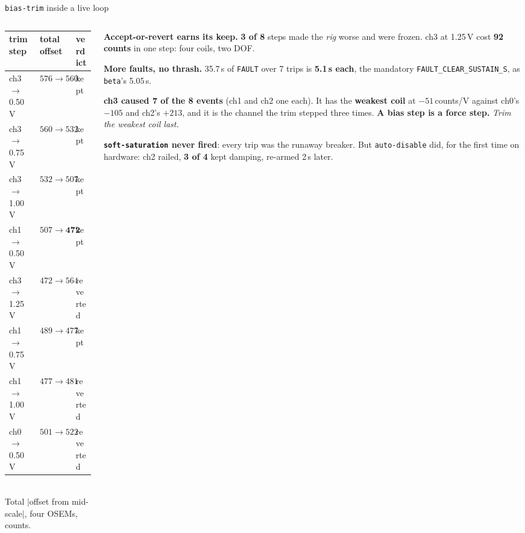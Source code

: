 \documentclass[aspectratio=169]{beamer}
\begin{document}
\begin{frame}{\texttt{bias-trim} inside a live loop}
  \begin{columns}[T]
    \begin{column}{0.49\textwidth}
      \centering
      {\scriptsize\setlength{\tabcolsep}{4pt}
      \begin{tabular}{@{}lll@{}}
        \toprule
        trim step & total offset & verdict \\
        \midrule
        ch3 $\to$ 0.50\,V & $576 \to 560$ & kept \\
        ch3 $\to$ 0.75\,V & $560 \to 532$ & kept \\
        ch3 $\to$ 1.00\,V & $532 \to 507$ & kept \\
        ch1 $\to$ 0.50\,V & $507 \to \mathbf{472}$ & kept \\
        ch3 $\to$ 1.25\,V & $472 \to 564$ & reverted \\
        ch1 $\to$ 0.75\,V & $489 \to 477$ & kept \\
        ch1 $\to$ 1.00\,V & $477 \to 481$ & reverted \\
        ch0 $\to$ 0.50\,V & $501 \to 522$ & reverted \\
        \bottomrule
      \end{tabular}}\\[1.5mm]
      {\scriptsize Total $|$offset from mid-scale$|$, four OSEMs, counts.}
    \end{column}
    \begin{column}{0.49\textwidth}
      \scriptsize\raggedright
      \textbf{Accept-or-revert earns its keep.} \textbf{3 of 8} steps made the
      \emph{rig} worse and were frozen. ch3 at 1.25\,V cost \textbf{92 counts}
      in one step: four coils, two DOF.

      \vspace{1.5mm}
      \textbf{More faults, no thrash.} 35.7\,s of \texttt{FAULT} over 7 trips is
      \textbf{5.1\,s each}, the mandatory \texttt{FAULT\_CLEAR\_SUSTAIN\_S}, as
      \texttt{beta}'s 5.05\,s.

      \vspace{1.5mm}
      \textbf{ch3 caused 7 of the 8 events} (ch1 and ch2 one each). It
      has the \textbf{weakest coil} at $-51$\,counts/V against ch0's $-105$ and
      ch2's $+213$, and it is the channel the trim stepped three times.
      \textbf{A bias step is a force step.} \emph{Trim the weakest coil last.}

      \vspace{1.5mm}
      \textbf{\texttt{soft-saturation} never fired}: every trip was the
      runaway breaker. But \texttt{auto-disable} did, for the first time on
      hardware: ch2 railed, \textbf{3 of 4} kept damping, re-armed 2\,s later.
    \end{column}
  \end{columns}
\end{frame}
\end{document}
